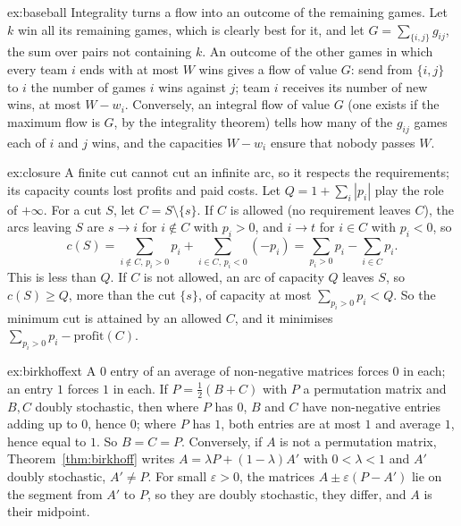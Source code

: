 \begin{solution}{ex:baseball}
\idea Integrality turns a flow into an outcome of the remaining games.
\writeup Let $k$ win all its remaining games, which is clearly best for it, and let $G=\sum_{\{i,j\}}g_{ij}$, the sum over pairs not containing $k$. An outcome of the
other games in which every team $i$ ends with at most $W$ wins gives a flow of value $G$: send from $\{i,j\}$ to $i$ the number of games $i$ wins against $j$;
team $i$ receives its number of new wins, at most $W-w_i$. Conversely, an integral flow of value $G$ (one exists if the maximum flow is $G$, by the
integrality theorem) tells how many of the $g_{ij}$ games each of $i$ and $j$ wins, and the capacities $W-w_i$ ensure that nobody passes $W$.
\end{solution}

\begin{solution}{ex:closure}
\idea A finite cut cannot cut an infinite arc, so it respects the requirements; its capacity counts lost profits and paid costs.
\writeup Let $Q=1+\sum_i|p_i|$ play the role of $+\infty$. For a cut $S$, let $C=S\setminus\{s\}$. If $C$ is allowed (no requirement leaves $C$), the arcs leaving $S$ are
$s\to i$ for $i\notin C$ with $p_i>0$, and $i\to t$ for $i\in C$ with $p_i<0$, so
\[
c(S)=\sum_{i\notin C,\,p_i>0}p_i+\sum_{i\in C,\,p_i<0}(-p_i)=\sum_{p_i>0}p_i-\sum_{i\in C}p_i.
\]
This is less than $Q$. If $C$ is not allowed, an arc of capacity $Q$ leaves $S$, so $c(S)\ge Q$, more than the cut $\{s\}$, of capacity at most $\sum_{p_i>0}p_i<Q$. So the
minimum cut is attained by an allowed $C$, and it minimises $\sum_{p_i>0}p_i-\mathrm{profit}(C)$.
\end{solution}

\begin{solution}{ex:birkhoffext}
\idea A $0$ entry of an average of non-negative matrices forces $0$ in each; an entry $1$ forces $1$ in each.
\writeup If $P=\frac12(B+C)$ with $P$ a permutation matrix and $B,C$ doubly stochastic, then where $P$ has $0$, $B$ and $C$ have non-negative entries adding up to $0$,
hence $0$; where $P$ has $1$, both entries are at most $1$ and average $1$, hence equal to $1$. So $B=C=P$. Conversely, if $A$ is not a permutation matrix,
Theorem~\ref{thm:birkhoff} writes $A=\lambda P+(1-\lambda)A'$ with $0<\lambda<1$ and $A'$ doubly stochastic, $A'\ne P$. For small $\varepsilon>0$, the matrices
$A\pm\varepsilon(P-A')$ lie on the segment from $A'$ to $P$, so they are doubly stochastic, they differ, and $A$ is their midpoint.
\end{solution}

